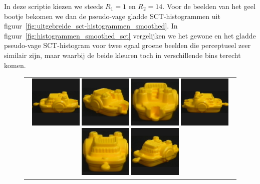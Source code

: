 In deze scriptie kiezen we steeds $R_1=1$ en $R_2=14$. Voor de beelden van het geel bootje
bekomen we dan de pseudo-vage gladde 
SCT-histogrammen uit figuur~\ref{fig:uitgebreide_sct-histogrammen_smoothed}.
In figuur~\ref{fig:histogrammen_smoothed_sct} vergelijken we het gewone en het gladde pseudo-vage 
SCT-histogram voor twee egaal groene beelden die perceptueel zeer similair zijn, maar waarbij 
de beide kleuren toch in verschillende bins terecht komen. 

\begin{figure}[bp]
\vspace{5pt}
\centering
\begin{tabular}{@{}c@{}}
\begin{minipage}{\textwidth}
\centering
\includegraphics[width=2.5cm]{coil/beeld-12.eps}
\includegraphics[width=2.5cm]{coil/beeld-16.eps}
\includegraphics[width=2.5cm]{coil/beeld-17.eps}
\includegraphics[width=2.5cm]{coil/beeld-13.eps}
\includegraphics[width=2.5cm]{coil/beeld-14.eps}
\includegraphics[width=2.5cm]{coil/beeld-15.eps}

\end{minipage}
\end{tabular}
\end{figure}
